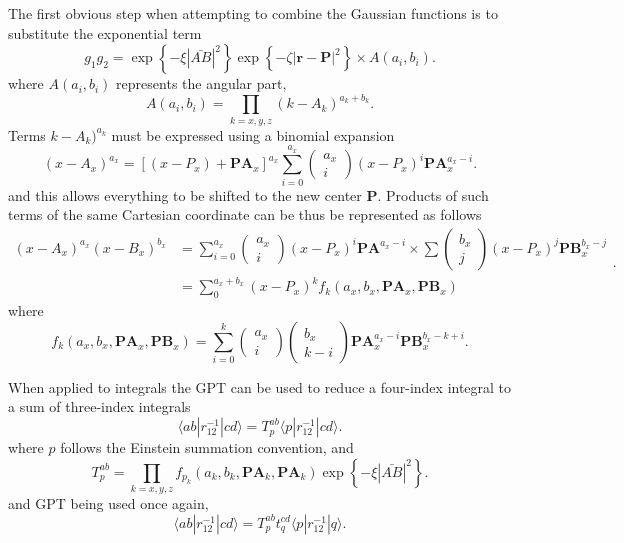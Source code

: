 The first obvious step when attempting to combine the Gaussian functions is to substitute the exponential term
\[
	g_1 g_2 = \exp \left\{ -\xi |\bar{AB}| ^2  \right\} \exp \left\{ -\zeta |\boldsymbol{r}-\boldsymbol{P}| ^2 \right\} \times A(a_i,b_i)
.\] 
where $A(a_i,b_i)$ represents the angular part,
 \[
	 A(a_i, b_i) = \prod_{k=x,y,z} (k-A_k)^{a_k + b_k} 
.\] 
Terms $k-A_k)^{a_k}$ must be expressed using a binomial expansion
 \[
	 (x-A_x)^{a_x} = [ (x-P_x) + \boldsymbol{PA}_x]^{a_x} \sum_{i=0}^{a_x} 
	 \begin{pmatrix}
	 	a_x \\
		i
	 \end{pmatrix}
	 (x-P_x)^i \boldsymbol{PA}_x ^{a_x-i}
.\] 
and this allows everything to be shifted to the new center $\boldsymbol{P}$. Products of such terms of the same Cartesian coordinate can be thus be represented as follows
\[
\begin{aligned}
	(x-A_x)^{a_x} (x-B_x)^{b_x} &= \sum_{i=0}^{a_x}
	\begin{pmatrix}
		a_x \\
		i
	\end{pmatrix}
	(x-P_x)^i \boldsymbol{PA} ^{a_x - i}  \times \sum
	\begin{pmatrix}
		b_x \\
		j
	\end{pmatrix}
	(x-P_x)^j \boldsymbol{PB}_x ^{b_x-j} \\
				    &= \sum_0^{a_x + b_x} (x-P_x)^k f_k(a_x,b_x,\boldsymbol{PA}_x, \boldsymbol{PB}_x)
\end{aligned}
.\] 
where
\[
	f_k(a_x,b_x,\boldsymbol{PA}_x,\boldsymbol{PB}_x) = \sum_{i=0}^k 
	\begin{pmatrix}
		a_x \\
		i
	\end{pmatrix}
	\begin{pmatrix}
		b_x \\
		k-i
	\end{pmatrix}
	\boldsymbol{PA}_x^{a_x - i} \boldsymbol{PB}_x^{b_x - k + i}
.\] 


When applied to integrals the GPT can be used to reduce a four-index integral to a sum of three-index integrals
\[
	\langle ab | r_{12}^{-1} | cd \rangle = T_p^{ab} \langle p | r_{12}^{-1} | cd \rangle 
.\] 
where $p$ follows the Einstein summation convention, and
 \[
	 T_p^{ab} = \prod_{k=x,y,z} f_{p_k} (a_k,b_k,\boldsymbol{PA}_k, \boldsymbol{PA}_k) \exp \left\{ - \xi |\bar{AB}|^2 \right\} 
.\] 
and GPT being used once again,
\[
	\langle ab | r_{12}^{-1} | cd \rangle = T_p^{ab} t_q^{cd} \langle p | r_{12}^{-1} | q \rangle  
.\] 

